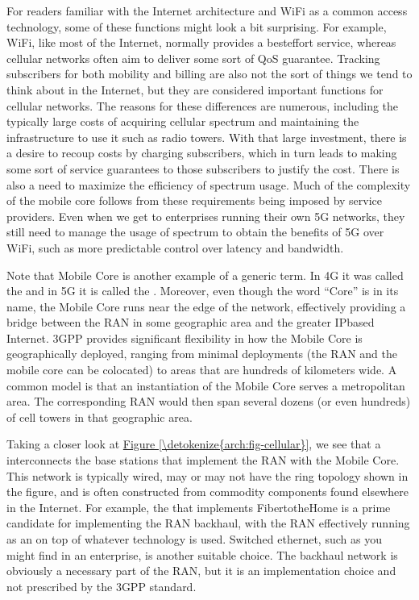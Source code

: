 \documentclass[a4paper,11pt,english]{sphinxmanual}
\begin{document}
\sphinxAtStartPar
For readers familiar with the Internet architecture and Wi\sphinxhyphen{}Fi as a
common access technology, some of these functions might look a bit
surprising. For example, Wi\sphinxhyphen{}Fi, like most of the Internet, normally
provides a best\sphinxhyphen{}effort service, whereas cellular networks often aim
to deliver some sort of QoS guarantee. Tracking subscribers for both
mobility and billing are also not the sort of things we tend to think
about in the Internet, but they are considered important functions for
cellular networks. The reasons for these differences are numerous,
including the typically large costs of acquiring cellular spectrum and
maintaining the infrastructure to use it such as radio towers. With
that large investment, there is a desire to recoup costs by charging
subscribers, which in turn leads to making some sort of service
guarantees to those subscribers to justify the cost. There is also a
need to maximize the efficiency of spectrum usage. Much of the
complexity of the mobile core follows from these requirements being
imposed by service providers. Even when we get to enterprises running
their own 5G networks, they still need to manage the usage of spectrum
to obtain the benefits of 5G over Wi\sphinxhyphen{}Fi, such as more predictable
control over latency and bandwidth.

\sphinxAtStartPar
Note that Mobile Core is another example of a generic term. In 4G it
was called the  and in 5G it is called the
. Moreover, even though the word “Core” is in its name,
the Mobile Core runs near the edge of the network, effectively providing
a bridge between the RAN in some geographic area and the greater
IP\sphinxhyphen{}based Internet. 3GPP provides significant flexibility in how the
Mobile Core is geographically deployed, ranging from minimal deployments
(the RAN and the mobile core can be co\sphinxhyphen{}located) to areas that are
hundreds of kilometers wide. A common model is that an instantiation
of the Mobile Core serves a metropolitan area. The corresponding RAN
would then span several dozens (or even hundreds) of cell towers in
that geographic area.

\sphinxAtStartPar
Taking a closer look at \hyperref[\detokenize{arch:fig-cellular}]{Figure \ref{\detokenize{arch:fig-cellular}}}, we see
that a  interconnects the base stations that
implement the RAN with the Mobile Core. This network is typically
wired, may or may not have the ring topology shown in the figure, and
is often constructed from commodity components found elsewhere in the
Internet. For example, the  that
implements Fiber\sphinxhyphen{}to\sphinxhyphen{}the\sphinxhyphen{}Home is a prime candidate for implementing the
RAN backhaul, with the RAN effectively running as an  on top
of whatever technology is used. Switched ethernet, such as you might
find in an enterprise, is another suitable choice. The backhaul
network is obviously a necessary part of the RAN, but it is an
implementation choice and not prescribed by the 3GPP standard.
\end{document}

